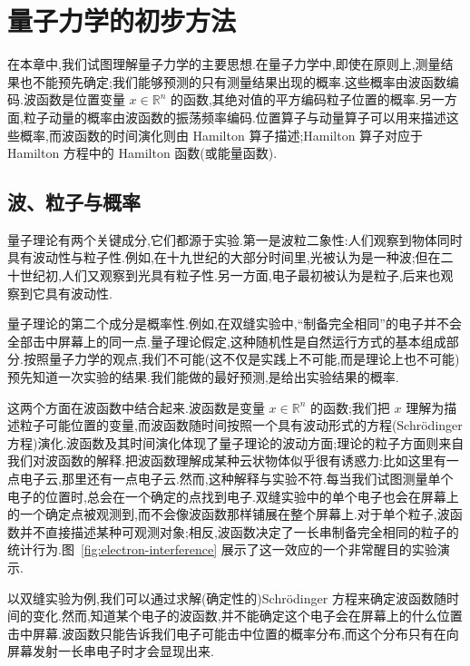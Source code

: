 \chapter{量子力学的初步方法}\label{chap:first-quantum}

在本章中,我们试图理解量子力学的主要思想.在量子力学中,即使在原则上,测量结果也不能预先确定;我们能够预测的只有测量结果出现的概率.这些概率由波函数编码.波函数是位置变量 \(x\in\mathbb{R}^{n}\) 的函数,其绝对值的平方编码粒子位置的概率.另一方面,粒子动量的概率由波函数的振荡频率编码.位置算子与动量算子可以用来描述这些概率,而波函数的时间演化则由 Hamilton 算子描述;Hamilton 算子对应于 Hamilton 方程中的 Hamilton 函数(或能量函数).

\section{波、粒子与概率}\label{sec:waves-particles-probabilities}

量子理论有两个关键成分,它们都源于实验.第一是波粒二象性:人们观察到物体同时具有波动性与粒子性.例如,在十九世纪的大部分时间里,光被认为是一种波;但在二十世纪初,人们又观察到光具有粒子性.另一方面,电子最初被认为是粒子,后来也观察到它具有波动性.

量子理论的第二个成分是概率性.例如,在双缝实验中,“制备完全相同”的电子并不会全部击中屏幕上的同一点.量子理论假定,这种随机性是自然运行方式的基本组成部分.按照量子力学的观点,我们不可能(这不仅是实践上不可能,而是理论上也不可能)预先知道一次实验的结果.我们能做的最好预测,是给出实验结果的概率.

这两个方面在波函数中结合起来.波函数是变量 \(x\in\mathbb{R}^{n}\) 的函数;我们把 \(x\) 理解为描述粒子可能位置的变量,而波函数随时间按照一个具有波动形式的方程(Schrödinger 方程)演化.波函数及其时间演化体现了量子理论的波动方面;理论的粒子方面则来自我们对波函数的解释.把波函数理解成某种云状物体似乎很有诱惑力:比如这里有一点电子云,那里还有一点电子云.然而,这种解释与实验不符.每当我们试图测量单个电子的位置时,总会在一个确定的点找到电子.双缝实验中的单个电子也会在屏幕上的一个确定点被观测到,而不会像波函数那样铺展在整个屏幕上.对于单个粒子,波函数并不直接描述某种可观测对象;相反,波函数决定了一长串制备完全相同的粒子的统计行为.图~\ref{fig:electron-interference} 展示了这一效应的一个非常醒目的实验演示.

以双缝实验为例,我们可以通过求解(确定性的)Schrödinger 方程来确定波函数随时间的变化.然而,知道某个电子的波函数,并不能确定这个电子会在屏幕上的什么位置击中屏幕.波函数只能告诉我们电子可能击中位置的概率分布,而这个分布只有在向屏幕发射一长串电子时才会显现出来.

